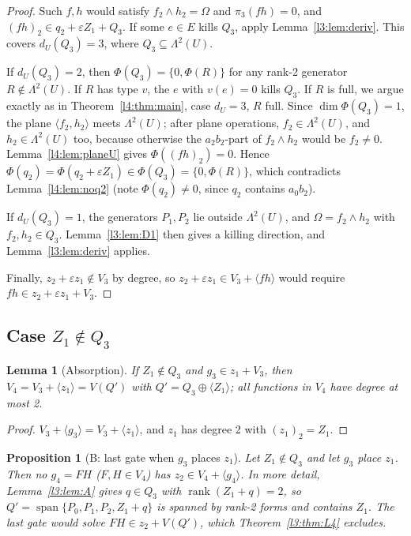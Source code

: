 \documentclass[11pt,a4paper]{article}
\theoremstyle{plain}
\newtheorem{lemma}[theorem]{Lemma}
\newtheorem{proposition}[theorem]{Proposition}
\theoremstyle{remark}
\newcommand{\Span}{\operatorname{span}}
\newcommand{\rk}{\operatorname{rank}}
\newcommand{\Lam}{\Lambda^2}
\newcommand{\dU}{d_U}
\begin{document}
\begin{proof}
Such $f,h$ would satisfy $f_2\wedge h_2=\Omega$ and $\pi_3(fh)=0$, and $(fh)_2\in q_2+\varepsilon Z_1+Q_3$. If some $e\in E$ kills $Q_3$, apply Lemma~\ref{l3:lem:deriv}. This covers $\dU(Q_3)=3$, where $Q_3\subseteq\Lam(U)$.

If $\dU(Q_3)=2$, then $\Phi(Q_3)=\{0,\Phi(R)\}$ for any rank-2 generator $R\notin\Lam(U)$. If $R$ has type $v$, the $e$ with $v(e)=0$ kills $Q_3$. If $R$ is full, we argue exactly as in Theorem~\ref{l4:thm:main}, case $\dU=3$, $R$ full. Since $\dim\Phi(Q_3)=1$, the plane $\langle f_2,h_2\rangle$ meets $\Lam(U)$; after plane operations, $f_2\in\Lam(U)$, and $h_2\in\Lam(U)$ too, because otherwise the $a_2b_2$-part of $f_2\wedge h_2$ would be $f_2\neq0$. Lemma~\ref{l4:lem:planeU} gives $\Phi((fh)_2)=0$. Hence $\Phi(q_2)=\Phi(q_2+\varepsilon Z_1)\in\Phi(Q_3)=\{0,\Phi(R)\}$, which contradicts Lemma~\ref{l4:lem:noq2} (note $\Phi(q_2)\neq0$, since $q_2$ contains $a_0b_2$).

If $\dU(Q_3)=1$, the generators $P_1,P_2$ lie outside $\Lam(U)$, and $\Omega=f_2\wedge h_2$ with $f_2,h_2\in Q_3$. Lemma~\ref{l3:lem:D1} then gives a killing direction, and Lemma~\ref{l3:lem:deriv} applies.

Finally, $z_2+\varepsilon z_1\notin V_3$ by degree, so $z_2+\varepsilon z_1\in V_3+\langle fh\rangle$ would require $fh\in z_2+\varepsilon z_1+V_3$.
\end{proof}

\subsection{Case $Z_1\notin Q_3$}

\begin{lemma}[Absorption]\label{l3:lem:abs}
If $Z_1\notin Q_3$ and $g_3\in z_1+V_3$, then $V_4=V_3+\langle z_1\rangle=V(Q')$ with $Q'=Q_3\oplus\langle Z_1\rangle$; all functions in $V_4$ have degree at most 2.
\end{lemma}

\begin{proof}
$V_3+\langle g_3\rangle=V_3+\langle z_1\rangle$, and $z_1$ has degree 2 with $(z_1)_2=Z_1$.
\end{proof}

\begin{proposition}[B: last gate when $g_3$ places $z_1$]\label{l3:prop:B}
Let $Z_1\notin Q_3$ and let $g_3$ place $z_1$. Then no $g_4=FH$ ($F,H\in V_4$) has $z_2\in V_4+\langle g_4\rangle$. In more detail, Lemma~\ref{l3:lem:A} gives $q\in Q_3$ with $\rk(Z_1+q)=2$, so $Q'=\Span\{P_0,P_1,P_2,Z_1+q\}$ is spanned by rank-2 forms and contains $Z_1$. The last gate would solve $FH\in z_2+V(Q')$, which Theorem~\ref{l3:thm:L4} excludes.
\end{proposition}
\end{document}
